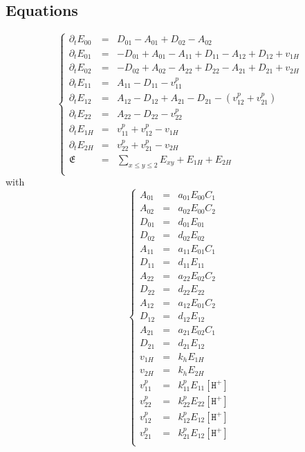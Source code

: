 \documentclass[aps,onecolumn,12pt]{revtex4}
\newcommand{\mychem}[1]{\mathtt{#1}}
\newcommand{\myconc}[1]{\left[#1\right]}
\newcommand{\spproton}{\mychem{H^+}}
\newcommand{\proton}{\myconc{\spproton}}
\begin{document}
\subsection{Equations}
\begin{equation}
\left\lbrace
\begin{array}{rcl}
\partial_t E_{00} & = & D_{01}-A_{01} + D_{02}-A_{02}\\
\partial_t E_{01} & = & -D_{01}+A_{01} - A_{11} + D_{11} - A_{12} + D_{12} + v_{1H}\\
\partial_t E_{02} & = & -D_{02}+A_{02} - A_{22} + D_{22} - A_{21} + D_{21} + v_{2H}\\
\partial_t E_{11} & = & A_{11}-D_{11} -v^p_{11}\\
\partial_t E_{12} & = & A_{12}-D_{12} + A_{21}-D_{21} - (v^p_{12}+v^p_{21})\\
\partial_t E_{22} & = & A_{22}-D_{22} - v^p_{22}\\
\partial_t E_{1H} & = & v^p_{11}+v^p_{12} - v_{1H}\\
\partial_t E_{2H} & = & v^p_{22}+v^p_{21} - v_{2H}\\
\mathfrak{E}      & = & {\displaystyle \sum_{x\leq y\leq 2} E_{xy}}+E_{1H}+E_{2H}\\
\end{array}
\right.
\end{equation}
with
\begin{equation}
\left\lbrace
\begin{array}{rcl}
A_{01} &= &a_{01} E_{00} C_1\\
A_{02} &= &a_{02} E_{00} C_2\\
D_{01} &= &d_{01} E_{01}\\
D_{02} &= &d_{02} E_{02}\\
A_{11} &= & a_{11} E_{01} C_1 \\
D_{11} &= &d_{11} E_{11}\\
A_{22} &= &a_{22} E_{02} C_2 \\
D_{22} &= &d_{22} E_{22}\\
A_{12} & = & a_{12} E_{01} C_2\\
D_{12} & = & d_{12} E_{12}\\
A_{21} & = & a_{21} E_{02} C_1\\
D_{21} & = & d_{21} E_{12}\\
v_{1H} & = & k_h E_{1H}\\
v_{2H} & = & k_h E_{2H}\\
v^p_{11} & = & k^p_{11} E_{11} \proton \\
v^p_{22} & = & k^p_{22} E_{22} \proton \\
v^p_{12} & = & k^p_{12} E_{12} \proton \\
v^p_{21} & = & k^p_{21} E_{12} \proton \\
\end{array}
\right.
\end{equation}
\end{document}
